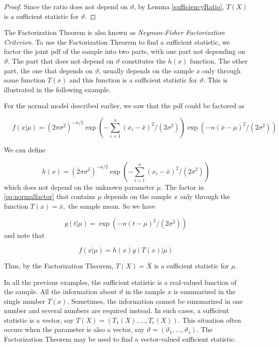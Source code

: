 \documentclass[ 11pt,%
				a4paper,%
				twoside,%
				headinclude,%
				footinclude = true,%
				cleardoublepage = empty,%
				reqno]{scrbook}
\begin{document}
\begin{theorem}
\begin{proof}
Since the ratio does not depend on $\vartheta$, by Lemma \ref{sufficiencyRatio}, $T(X)$ is a sufficient statistic for $\vartheta$.
\end{proof}

\end{theorem}

The Factorization Theorem is also known as \emph{Neyman-Fisher Factorization Criterion}. To use the Factorization Theorem to find a sufficient statistic, we factor the joint pdf of the sample into two parts, with one part not depending on $\vartheta$. The part that does not depend on $\vartheta$ constitutes the $h({x})$ function. The other part, the one that depends on $\vartheta$, usually depends on the sample $x$ only through some function $T(x)$ and this function is a sufficient statistic for $\vartheta$. This is illustrated in the following example.

\begin{example}

 For the normal model described earlier, we saw that the pdf could be factored as

\begin{equation}~\label{eq:normalfactor}
 \quad f({x} | \mu)=\left(2 \pi \sigma^{2}\right)^{-n / 2} \exp \left(-\sum_{i=1}^{n}\left(x_{i}-\bar{x}\right)^{2} /\left(2 \sigma^{2}\right)\right) \exp \left(-n(\bar{x}-\mu)^{2} /\left(2 \sigma^{2}\right)\right)  
\end{equation}

We can define

\[
h({x})=\left(2 \pi \sigma^{2}\right)^{-n / 2} \exp \left(-\sum_{i=1}^{n}\left(x_{i}-\bar{x}\right)^{2} /\left(2 \sigma^{2}\right)\right)
\]
which does not depend on the unknown parameter $\mu .$ The factor in \eqref{eq:normalfactor} that contains $\mu$ depends on the sample $x$ only through the function $T({x})=\bar{x},$ the sample mean. So we have

\[
g(t | \mu)=\exp \left(-n(t-\mu)^{2} /\left(2 \sigma^{2}\right)\right)
\]
and note that

\[
f({x} | \mu)=h({x}) g(T({x}) | \mu)
\]

Thus, by the Factorization Theorem, $T({X})=\bar{X}$ is a sufficient statistic for $\mu$.


\end{example}


In all the previous examples, the sufficient statistic is a real-valued function of the sample. All the information about $\vartheta$ in the sample $x$ is summarized in the single number $T({x})$. Sometimes, the information cannot be summarized in one number and several numbers are required instead. In such cases, a sufficient statistic is a vector, say $T({X})=\left(T_{1}({X}), \ldots, T_{r}({X})\right) .$ This situation often occurs when the parameter is also a vector, say ${\vartheta}=\left(\vartheta_{1}, \ldots, \vartheta_{s}\right)$. The Factorization Theorem may be used to find a vector-valued sufficient statistic.
\end{document}
